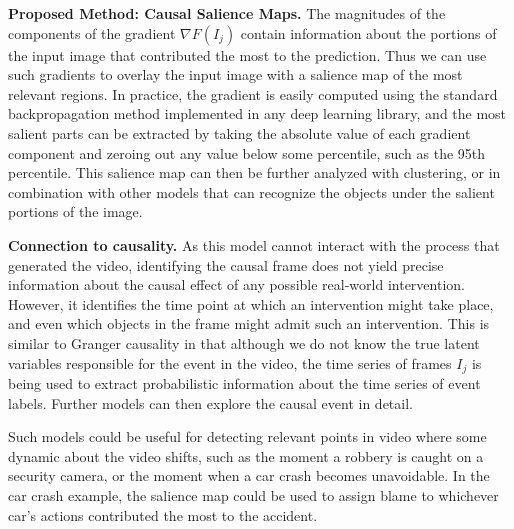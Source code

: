 \documentclass[letterpaper, twocolumn]{article} %
\begin{document}
\noindent \textbf{Proposed Method: Causal Salience Maps.} The magnitudes of the components of the gradient $\nabla F(I_j)$ contain information about the portions of the input image that contributed the most to the prediction. Thus we can use such gradients to overlay the input image with a salience map of the most relevant regions. In practice, the gradient is easily computed using the standard backpropagation method implemented in any deep learning library, and the most salient parts can be extracted by taking the absolute value of each gradient component and zeroing out any value below some percentile, such as the 95th percentile. This salience map can then be further analyzed with clustering, or in combination with other models that can recognize the objects under the salient portions of the image.

\noindent \textbf{Connection to causality.} As this model cannot interact with the process that generated the video, identifying the causal frame does not yield precise information about the causal effect of any possible real-world intervention. However, it identifies the time point at which an intervention might take place, and even which objects in the frame might admit such an intervention. This is similar to Granger causality in that although we do not know the true latent variables responsible for the event in the video,  the time series of frames $I_j$ is being used to extract probabilistic information about the time series of event labels. Further models can then explore the causal event in detail. 

Such models could be useful for detecting relevant points in video where some dynamic about the video shifts, such as the moment a robbery is caught on a security camera, or the moment when a car crash becomes unavoidable. In the car crash example, the salience map could be used to assign blame to whichever car's actions contributed the most to the accident.

\vspace{-0.5cm}
\end{document}
